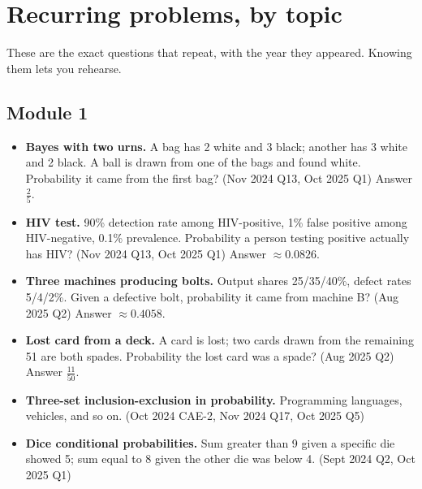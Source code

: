 \documentclass[11pt,a4paper]{article}
\begin{document}
\section{Recurring problems, by topic}

These are the exact questions that repeat, with the year they appeared. Knowing them lets you rehearse.

\subsection{Module 1}
\begin{itemize}
\item \textbf{Bayes with two urns.} A bag has 2 white and 3 black; another has 3 white and 2 black. A ball is drawn from one of the bags and found white. Probability it came from the first bag? (Nov 2024 Q13, Oct 2025 Q1) Answer $\tfrac{2}{5}$.
\item \textbf{HIV test.} 90\% detection rate among HIV-positive, 1\% false positive among HIV-negative, 0.1\% prevalence. Probability a person testing positive actually has HIV? (Nov 2024 Q13, Oct 2025 Q1) Answer $\approx 0.0826$.
\item \textbf{Three machines producing bolts.} Output shares 25/35/40\%, defect rates 5/4/2\%. Given a defective bolt, probability it came from machine B? (Aug 2025 Q2) Answer $\approx 0.4058$.
\item \textbf{Lost card from a deck.} A card is lost; two cards drawn from the remaining 51 are both spades. Probability the lost card was a spade? (Aug 2025 Q2) Answer $\tfrac{11}{50}$.
\item \textbf{Three-set inclusion-exclusion in probability.} Programming languages, vehicles, and so on. (Oct 2024 CAE-2, Nov 2024 Q17, Oct 2025 Q5)
\item \textbf{Dice conditional probabilities.} Sum greater than 9 given a specific die showed 5; sum equal to 8 given the other die was below 4. (Sept 2024 Q2, Oct 2025 Q1)
\end{itemize}
\end{document}
